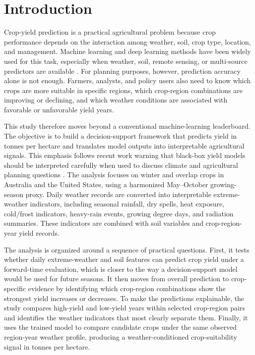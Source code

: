 \documentclass[11pt,a4paper]{article}
\begin{document}
\section{Introduction}
Crop-yield prediction is a practical agricultural problem because crop performance depends on the interaction among weather, soil, crop type, location, and management. Machine learning and deep learning methods have been widely used for this task, especially when weather, soil, remote sensing, or multi-source predictors are available \citep{vanKlompenburg2020CropYieldReview,Jabed2024Comprehensive,Pathak2023InputModalities}. For planning purposes, however, prediction accuracy alone is not enough. Farmers, analysts, and policy users also need to know which crops are more suitable in specific regions, which crop-region combinations are improving or declining, and which weather conditions are associated with favorable or unfavorable yield years.

This study therefore moves beyond a conventional machine-learning leaderboard. The objective is to build a decision-support framework that predicts yield in tonnes per hectare and translates model outputs into interpretable agricultural signals. This emphasis follows recent work warning that black-box yield models should be interpreted carefully when used to discuss climate and agricultural planning questions \citep{Hu2023ExplainableYield,Morales2023PastFuture}. The analysis focuses on winter and overlap crops in Australia and the United States, using a harmonized May--October growing-season proxy. Daily weather records are converted into interpretable extreme-weather indicators, including seasonal rainfall, dry spells, heat exposure, cold/frost indicators, heavy-rain events, growing degree days, and radiation summaries. These indicators are combined with soil variables and crop-region-year yield records.

The analysis is organized around a sequence of practical questions. First, it tests whether daily extreme-weather and soil features can predict crop yield under a forward-time evaluation, which is closer to the way a decision-support model would be used for future seasons. It then moves from overall prediction to crop-specific evidence by identifying which crop-region combinations show the strongest yield increases or decreases. To make the predictions explainable, the study compares high-yield and low-yield years within selected crop-region pairs and identifies the weather indicators that most clearly separate them. Finally, it uses the trained model to compare candidate crops under the same observed region-year weather profile, producing a weather-conditioned crop-suitability signal in tonnes per hectare.
\end{document}
